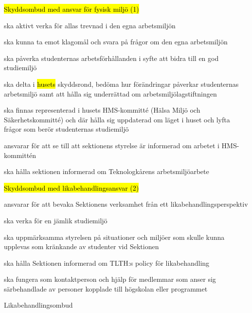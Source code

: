 \documentclass[../_main/handlingar.tex]{subfiles}
\begin{document}
\begin{attsatser}
  \hl{Skyddsombud med ansvar för fysisk miljö (1)}
  \begin{tightdashlist}
      \item ska aktivt verka för allas trevnad i den egna arbetsmiljön
      \item ska kunna ta emot klagomål och svara på frågor om den egna arbetsmiljön
      \item ska påverka studenternas arbetsförhållanden i syfte att bidra till en god studiemiljö
      \item ska delta i \hl{husets} skyddsrond, bedöma hur förändringar påverkar studenternas arbetsmiljö samt att hålla sig underrättad om arbetsmiljölagstiftningen
      \item ska finnas representerad i husets HMS-kommitté (Hälsa Miljö och Säkerhetskommitté) och där hålla sig uppdaterad om läget i huset och lyfta frågor som berör studenternas studiemiljö
      \item ansvarar för att se till att sektionens styrelse är informerad om arbetet i HMS-kommittén
      \item ska hålla sektionen informerad om Teknologkårens arbetsmiljöarbete
  \end{tightdashlist}
  \hl{Skyddsombud med likabehandlingsansvar (2)}
  \begin{tightdashlist}
      \item ansvarar för att bevaka Sektionens verksamhet från ett likabehandlingsperspektiv
      \item ska verka för en jämlik studiemiljö
      \item ska uppmärksamma styrelsen på situationer och miljöer som skulle kunna upplevas som kränkande av studenter vid Sektionen
      \item ska hålla Sektionen informerad om TLTH:s policy för likabehandling
      \item ska fungera som kontaktperson och hjälp för medlemmar som anser sig särbehandlade av personer kopplade till högskolan eller programmet
  \end{tightdashlist}
\end{attsatser}

\begin{signatures}{1}
    \signature{Fanny Månefjord och Lina Samnegård}{Likabehandlingsombud}
\end{signatures}
\end{document}
